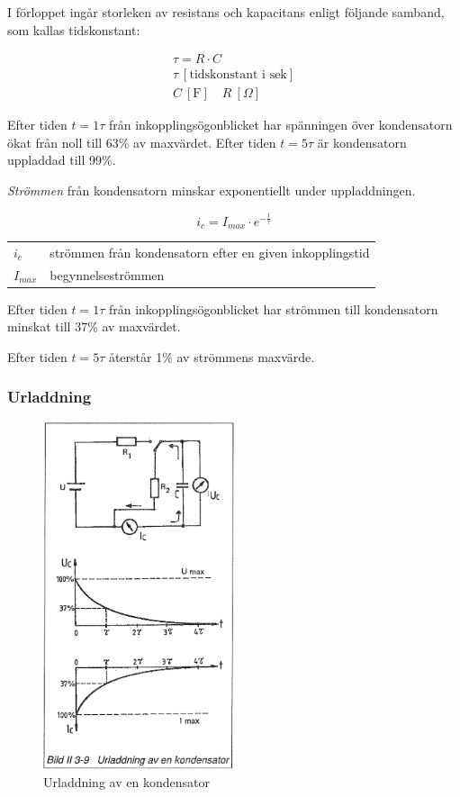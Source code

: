 I förloppet ingår storleken av resistans och kapacitans enligt följande samband,
som kallas tidskonstant:

\begin{gather*}
  \tau = R \cdot C \\
  \tau\ [\text{tidskonstant i sek}] \\  
  C\ [\text{F}] \quad R\ [Ω]
\end{gather*}

Efter tiden \(t = 1\tau\) från inkopplingsögonblicket har spänningen över
kondensatorn ökat från noll till 63\% av maxvärdet. Efter tiden \(t = 5\tau\)
är kondensatorn uppladdad till 99\%.

\emph{Strömmen} från kondensatorn minskar exponentiellt under uppladdningen.

\[i_c = I_{max} \cdot e^{-\frac{t}{\tau}}\]

\begin{tabular}{lp{}}
  \(i_c\) & strömmen från kondensatorn efter en given inkopplingstid \\
  \(I_{max}\) & begynnelseströmmen \\
\end{tabular}

Efter tiden \(t = 1\tau\) från inkopplingsögonblicket har strömmen till
kondensatorn minskat till 37\% av maxvärdet.

Efter tiden \(t = 5\tau\) återstår 1\% av strömmens maxvärde.

\subsubsection{Urladdning}

\begin{figure}
\includegraphics[width=0.5\textwidth]{images/bild_2_3-09}
\caption{Urladdning av en kondensator}
\label{fig:BildII3-09}
\end{figure}

